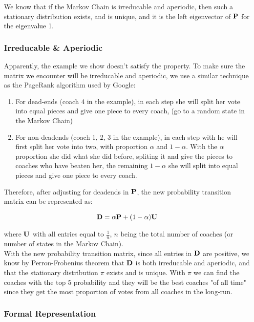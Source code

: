 \documentclass[titlepage]{article}
\begin{document}
\noindent We know that if the Markov Chain is irreducable and aperiodic, then such a stationary distribution exists, and is unique, and it is the left eigenvector of $\bf{P}$ for the eigenvalue 1.


\subsubsection*{Irreducable \& Aperiodic}

\noindent Apparently, the example we show doesn't satisfy the property. To make sure the matrix we encounter will be irreducable and aperiodic, we use a similar technique as the PageRank algorithm used by Google:

\begin{enumerate}
\item For dead-ends (coach 4 in the example), in each step she will split her vote into equal pieces and give one piece to every coach, (go to a random state in the Markov Chain)
\item For non-deadends (coach 1, 2, 3 in the example), in each step with he will first split her vote into two, with proportion $\alpha$ and $1 - \alpha$. With the $\alpha$ proportion she did what she did before, spliting it and give the pieces to coaches who have beaten her, the remaining $1 - \alpha$ she will split into equal pieces and give one piece to every coach.
\end{enumerate}

\noindent Therefore, after adjusting for deadends in ${\bf P}$, the new probability transition matrix can be represented as:

$${\bf D} = \alpha {\bf P} + (1 - \alpha) {\bf U}$$

\noindent where $\bf{U}$ with all entries equal to $\frac{1}{n}$, $n$ being the total number of coaches (or number of states in the Markov Chain).
\\

\noindent With the new probability transition matrix, since all entries in $\bf{D}$ are positive, we know by Perron-Frobenius theorem that $\bf{D}$ is both irreducable and aperiodic, and that the stationary distribution $\pi$ exists and is unique. With $\pi$ we can find the coaches with the top $5$ probability and they will be the best coaches "of all time" since they get the most proportion of votes from all coaches in the long-run.

\subsubsection*{Formal Representation}
\end{document}
